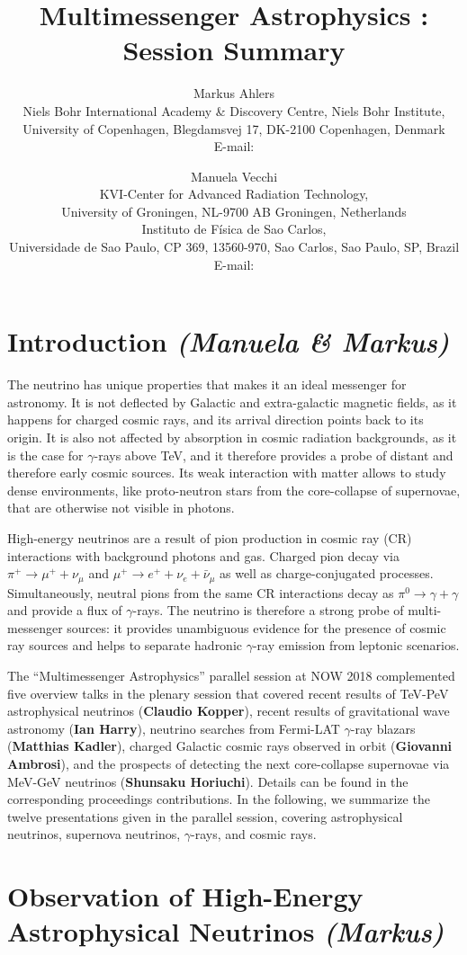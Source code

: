 \documentclass{PoS}
\title{Multimessenger Astrophysics : Session Summary}
\author{Markus Ahlers\\
        Niels Bohr International Academy \& Discovery Centre, Niels Bohr Institute,\\University of Copenhagen, Blegdamsvej 17, DK-2100 Copenhagen, Denmark\\
        E-mail: \email{markus.ahlers@nbi.ku.dk}}
\author{Manuela Vecchi\\
       KVI-Center for Advanced Radiation Technology,\\University of Groningen, NL-9700 AB Groningen, Netherlands\\Instituto de F\'isica de Sao Carlos,\\ Universidade de Sao Paulo, CP 369, 13560-970, Sao Carlos, Sao Paulo, SP, Brazil\\
        E-mail: \email{m.vecchi@rug.nl}}
\begin{document}
\section{Introduction {\it (Manuela \& Markus)}}


The neutrino has unique properties that makes it an ideal messenger for astronomy. It is not deflected by Galactic and extra-galactic magnetic fields, as it happens for charged cosmic rays, and its arrival direction points back to its origin. It is also not affected by absorption in cosmic radiation backgrounds, as it is the case for $\gamma$-rays above TeV, and it therefore provides a probe of distant and therefore early cosmic sources. Its weak interaction with matter allows to study dense environments, like proto-neutron stars from the core-collapse of supernovae, that are otherwise not visible in photons.

High-energy neutrinos are a result of pion production in cosmic ray (CR) interactions with background photons and gas. Charged pion decay via $\pi^+\to\mu^++\nu_\mu$ and $\mu^+\to e^++\nu_e+\bar\nu_\mu$ as well as charge-conjugated processes. Simultaneously, neutral pions from the same CR interactions decay as $\pi^0\to\gamma+\gamma$ and provide a flux of $\gamma$-rays. The neutrino is therefore a strong probe of multi-messenger sources: it provides unambiguous evidence for the presence of cosmic ray sources and helps to separate hadronic $\gamma$-ray emission from leptonic scenarios.

The ``Multimessenger Astrophysics'' parallel session at NOW 2018 complemented five overview talks in the plenary session that covered recent results of TeV-PeV astrophysical neutrinos ({\bf Claudio Kopper}), recent results of gravitational wave astronomy ({\bf Ian Harry}), neutrino searches from Fermi-LAT $\gamma$-ray blazars ({\bf Matthias Kadler}), charged Galactic cosmic rays observed in orbit ({\bf  Giovanni Ambrosi}), and the prospects of detecting the next core-collapse supernovae via MeV-GeV neutrinos ({\bf Shunsaku Horiuchi}). Details can be found in the corresponding proceedings contributions. In the following, we summarize the twelve presentations given in the parallel session, covering astrophysical neutrinos, supernova neutrinos, $\gamma$-rays, and cosmic rays.

\section{Observation of High-Energy Astrophysical Neutrinos {\it (Markus)}}
\end{document}

